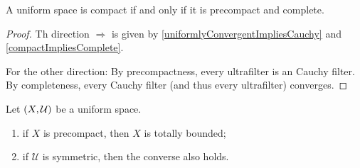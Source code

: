 \begin{proposition} \label{compactPrecompactComplete}
A uniform space is compact \textup{if and only if} it is precompact and complete.
\end{proposition}
\begin{proof}
Th direction $\Rightarrow$ is given by \ref{uniformlyConvergentImpliesCauchy} and \ref{compactImpliesComplete}.

For the other direction: By precompactness, every ultrafilter is an Cauchy filter. By completeness, every Cauchy filter (and thus every ultrafilter) converges.
\end{proof}

\begin{proposition} \label{precompactTotallyBounded}
Let $\sSet{X,\mathcal{U}}$ be a uniform space. 
\begin{enumerate}
\item if $X$ is precompact, then $X$ is totally bounded;
\item if $\mathcal{U}$ is symmetric, then the converse also holds.
\end{enumerate}
\end{proposition}
